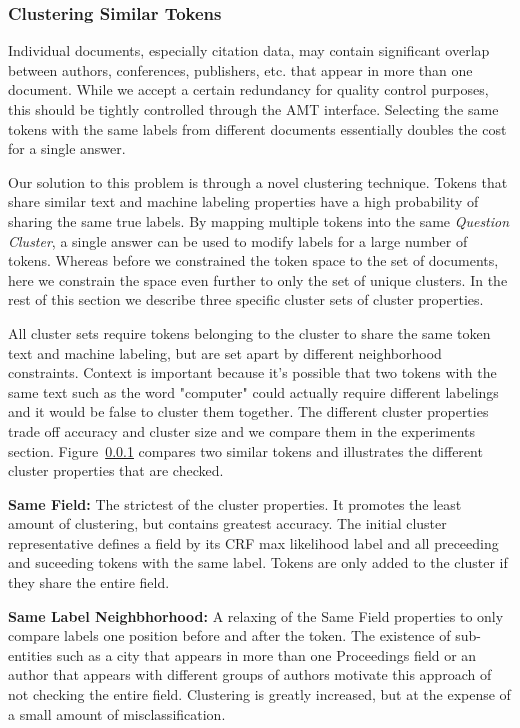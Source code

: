 \subsubsection{Clustering Similar Tokens}
Individual documents, especially citation data, may contain significant overlap between authors, conferences, publishers, etc. that appear in more than one document.  While we accept a certain redundancy for quality control purposes, this should be tightly controlled through the AMT interface.  Selecting the same tokens with the same labels from different documents essentially doubles the cost for a single answer.

Our solution to this problem is through a novel clustering technique.  Tokens that share similar text and machine labeling properties have a high probability of sharing the same true labels.  By mapping multiple tokens into the same \textit{Question Cluster}, a single answer can be used to modify labels for a large number of tokens.  Whereas before we constrained the token space to the set of documents, here we constrain the space even further to only the set of unique clusters.  In the rest of this section we describe three specific cluster sets of cluster properties.

All cluster sets require tokens belonging to the cluster to share the same token text and machine labeling, but are set apart by different neighborhood constraints.  Context is important because it's possible that two tokens with the same text such as the word "computer" could actually require different labelings and it would be false to cluster them together.  The different cluster properties trade off accuracy and cluster size and we compare them in the experiments section.  Figure~\ref{} compares two similar tokens and illustrates the different cluster properties that are checked.

\textbf{Same Field:} The strictest of the cluster properties.  It promotes the least amount of clustering, but contains greatest accuracy.  The initial cluster representative defines a field by its CRF max likelihood label and all preceeding and suceeding tokens with the same label.  Tokens are only added to the cluster if they share the entire field.

\textbf{Same Label Neighbhorhood:} A relaxing of the Same Field properties to only compare labels one position before and after the token.  The existence of sub-entities such as a city that appears in more than one Proceedings field or an author that appears with different groups of authors motivate this approach of not checking the entire field.  Clustering is greatly increased, but at the expense of a small amount of misclassification.

